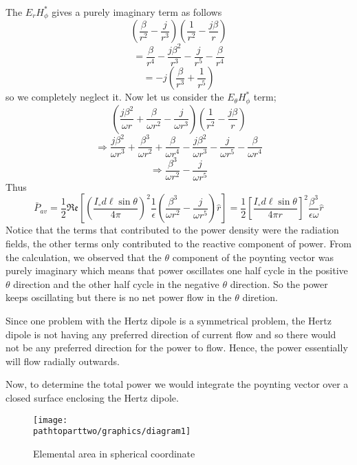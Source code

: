 \paragraph{}
The $E_rH_\phi^*$ gives a purely imaginary term as follows
$$\left(\dfrac{\beta}{r^2} - \dfrac{j}{r^3}\right)\left(\dfrac{1}{r^2} 
 - \dfrac{j\beta}{r}\right)$$
$$=  \dfrac{\beta}{r^4} - \dfrac{j\beta^2}{r^3} 
- \dfrac{j}{r^5} - \dfrac{\beta}{r^4} $$
$$= -j\left( \dfrac{\beta}{r^3}  +  \dfrac{1}{r^5}\right) $$
so we completely neglect it. Now let us consider the $E_\theta H_\phi^*$ term;
$$\left(\dfrac{j\beta^2}{\omega r} + \dfrac{\beta}{\omega r^2} - \dfrac{j}{\omega r^3}\right)\left(\dfrac{1}{r^2} - \dfrac{j\beta}{r}\right)$$
$$\Longrightarrow \dfrac{j\beta^2}{\omega r^3} 
+ \dfrac{\beta^3}{\omega r^2} + \dfrac{\beta}{\omega r^4} 
- \dfrac{j\beta^2}{\omega r^3} - \dfrac{j}{\omega r^5}
- \dfrac{\beta}{\omega r^4}$$
$$\Longrightarrow \dfrac{\beta^3}{\omega r^2} - \dfrac{j}{\omega r^5}$$
Thus \quad  
\begin{dmath*}
\bar{P}_{av} = \dfrac{1}{2}\mathfrak{Re}\left[\left(\dfrac{I_\circ d\ell\sin\theta}{4\pi}\right)^2\dfrac{1}{\epsilon} \left(\dfrac{\beta^3}{\omega r^2} - \dfrac{j}{\omega r^5}\right)\hat{r}\right]
= \dfrac{1}{2}
\left[\dfrac{I_\circ d\ell\sin\theta}{4\pi r}\right]^2 \dfrac{\beta^3}{\epsilon\omega}\hat{r} 
\end{dmath*}
Notice that the terms that contributed to the power density were the radiation fields, the other terms only contributed to the reactive component of power. From the calculation, we observed that the $\theta$  component of the poynting vector was purely imaginary which means that power oscillates one half cycle in the positive $\theta$ direction and the other half cycle in the negative $\theta$ direction. So the power keeps oscillating but there is no net power flow in the $\theta$ diretion.

Since one problem with the Hertz dipole is a symmetrical problem, the Hertz dipole is not having any preferred direction of current flow and so there would not be any preferred direction for the power to flow. Hence, the power essentially will flow radially outwards.

Now, to determine the total power we would integrate the poynting vector over a closed surface enclosing the Hertz dipole.
\begin{figure}[h]
\centering
\texttt{[image: \\pathtoparttwo/graphics/diagram1]}
\caption{Elemental area in spherical coordinate}
\label{figure12}
\end{figure}

